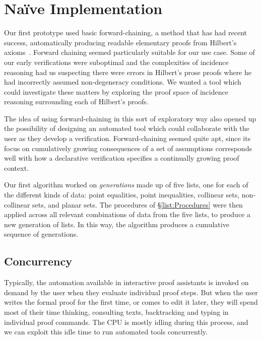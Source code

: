
\section{Na\"{i}ve Implementation}\label{sec:NaiveImplementation}
Our first prototype used basic forward-chaining, a method that has had recent success, automatically producing readable elementary proofs from Hilbert's axioms~\cite{ForwardChainHilbert}. Forward chaining seemed particularly suitable for our use case. Some of our early verifications were suboptimal and the complexities of incidence reasoning had us suspecting there were errors in Hilbert's prose proofs where he had incorrectly assumed non-degeneracy conditions. We wanted a tool which could investigate these matters by exploring the proof space of incidence reasoning surrounding each of Hilbert's proofs. 

The idea of using forward-chaining in this sort of exploratory way also opened up the possibility of designing an automated tool which could collaborate with the user as they develop a verification. Forward-chaining seemed quite apt, since its focus on cumulatively growing consequences of a set of assumptions corresponds well with how a declarative verification specifies a continually growing proof context. 

Our first algorithm worked on \emph{generations} made up of five lists, one for each of the different kinds of data: point equalities, point inequalities, collinear sets, non-collinear sets, and planar sets. The procedures of \S\ref{list:Procedures} were then applied across all relevant combinations of data from the five lists, to produce a new generation of lists. In this way, the algorithm produces a cumulative sequence of generations.

\subsection{Concurrency}\label{sec:NaiveConcurrency}
Typically, the automation available in interactive proof assistants is invoked on demand by the user when they evaluate individual proof steps. But when the user writes the formal proof for the first time, or comes to edit it later, they will spend most of their time thinking, consulting texts, backtracking and typing in individual proof commands. The CPU is mostly idling during this process, and we can exploit this idle time to run automated tools concurrently.

